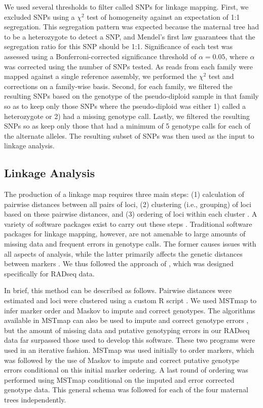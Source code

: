 \documentclass[smallextended]{svjour3}
\begin{document}
We used several thresholds to filter called SNPs for linkage mapping. First, we
excluded SNPs using a $\chi^2$ test of homogeneity against an expectation of 1:1
segregation.  This segregation pattern was expected because the maternal tree
had to be a heterozygote to detect a SNP, and Mendel's first law guarantees that
the segregation ratio for this SNP should be 1:1. Significance of each test was
assessed using a Bonferroni-corrected significance threshold of $\alpha = 0.05$,
where $\alpha$ was corrected using the number of SNPs tested. As reads from each
family were mapped against a single reference assembly, we performed the
$\chi^2$ test and corrections on a family-wise basis.  Second, for each family,
we filtered the resulting SNPs based on the genotype of the pseudo-diploid
sample in that family so as to keep only those SNPs where the pseudo-diploid was
either 1) called a heterozygote or 2) had a missing genotype call.  Lastly, we
filtered the resulting SNPs so as keep only those that had a minimum of 5
genotype calls for each of the alternate alleles. The resulting subset of SNPs
was then used as the input to linkage analysis.

\subsection*{Linkage Analysis}\label{ss:linkage}
The production of a linkage map requires three main steps: (1)
calculation of pairwise distances between all pairs of loci, (2) clustering
(i.e., grouping) of loci based on these pairwise distances, and (3) ordering of
loci within each cluster \citep{Cheema:2009}.  A variety of software packages
exist to carry out these steps \citep[e.g.,][]{VanOoijen:2011}. Traditional
software packages for linkage mapping, however, are not amenable to large
amounts of missing data and frequent errors in genotype calls. The former causes
issues with all aspects of analysis, while the latter primarily affects the
genetic distances between markers \citep{Hackett:2003, Cartwright:2007}. We thus
followed the approach of \citet{Ward:2013}, which was designed specifically for
RADseq data.

In brief, this method can be described as follows. Pairwise distances were
estimated and loci were clustered using a custom R script \citep{R:2013}. We
used MSTmap \citep{Wu:2008a} to infer marker order and Maskov \citep{Ward:2013}
to impute and correct genotypes. The algorithms available in MSTmap can also be
used to impute and correct genotype errors \citep[see][]{Wu:2008a}, but the
amount of missing data and putative genotyping errors in our RADseq data far
surpassed those used to develop this software. These two programs were used in
an iterative fashion. MSTmap was used initially to order markers, which was
followed by the use of Maskov to impute and correct putative genotype errors
conditional on this initial marker ordering. A last round of ordering was
performed using MSTmap conditional on the imputed and error corrected genotype
data. This general schema was followed for each of the four maternal trees
independently.
\end{document}
